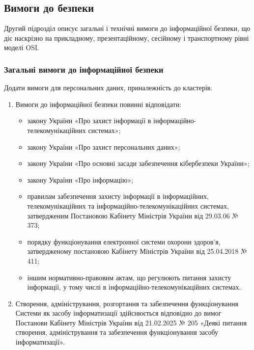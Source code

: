 \documentclass{article}
\begin{document}
\newpage

\subsection{Вимоги до безпеки}

Другий підрозділ описує загальні і технічні вимоги до інформаційної безпеки, що діє наскрізно на прикладному,
презентаційному, сесійному і транспортному рівні моделі OSI.

\subsubsection{Загальні вимоги до інформаційної безпеки}

Додати вимоги для персональних даних, приналежність до кластерів.

\begin{enumerate}
  \item Вимоги до інформаційної безпеки повинні відповідати:
    \begin{itemize}
      \item закону України «Про захист інформації в інформаційно-телекомунікаційних системах»;
      \item закону України «Про захист персональних даних»;
      \item закону України «Про основні засади забезпечення кібербезпеки України»;
      \item закону України «Про інформацію»;
      \item правилам забезпечення захисту інформації в інформаційних, телекомунікаційних та інформаційно-телекомунікаційних системах, затвердженим Постановою Кабінету Міністрів України від 29.03.06 № 373;
      \item порядку функціонування електронної системи охорони здоров’я, затвердженому постановою Кабінету Міністрів України від 25.04.2018 № 411;
      \item іншим нормативно-правовим актам, що регулюють питання захисту інформації, у тому числі в інформаційно-телекомунікаційних системах.
    \end{itemize}

  \item Створення, адміністрування, розгортання та забезпечення функціонування Системи як засобу інформатизації здійснюється відповідно до вимог Постанови Кабінету Міністрів України від 21.02.2025 № 205 «Деякі питання створення, адміністрування та забезпечення функціонування засобу інформатизації».


\end{enumerate}
\end{document}
